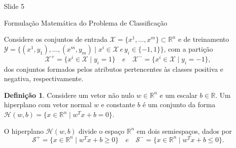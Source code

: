 \documentclass[12pt]{beamer}
\def\Xset{\mathcal{X}}
\def\Yset{\mathcal{Y}}
\def\Hset{\mathcal{H}}
\def\RR{\mathds{R}}
\theoremstyle{definition}%
\newtheorem{defi}{Definição}
\begin{document}
Slide 5
\begin{frame}{Formulação Matemática do Problema de Classificação}

Considere os conjuntos de entrada $\Xset =\{x^1, \ldots , x^m \} \subset \RR^n$ e de treinamento $\Yset=\{(x^1, y_1), \ldots , (x^m, y_m)\mid x^i \in \Xset \, e \, y_i \in \{-1,1\}\}$, com a partição 
\[ \label{conj1}
\Xset ^{+} =\{x^i \in \Xset\mid y_i=1\} \quad e \quad \Xset^{-}=\{x^i \in \Xset\mid y_i=-1\},
\]
dos conjuntos formados pelos atributos pertencentes às classes positiva e negativa, respectivamente.

\begin{defi} Considere um vetor não nulo $w\in \RR^n$ e um escalar $b\in \RR$. Um hiperplano com vetor normal $w$ e constante $b$ é um conjunto da forma $\Hset(w,b)=\{x\in \RR^n \mid w^{T}x+b=0\}$.
\end{defi}

O hiperplano $\Hset(w,b)$ divide o espaço $\RR^n$ em dois semiespaços, dados por
\[ \label{conj2}
\mathcal{S}^{+}=\{x\in \RR^n \mid w^{T}x+b\geq 0\} \quad e \quad \mathcal{S}^{-}=\{x\in \RR^n \mid w^{T}x+b\leq 0\}.
\]

\end{frame}
\end{document}
